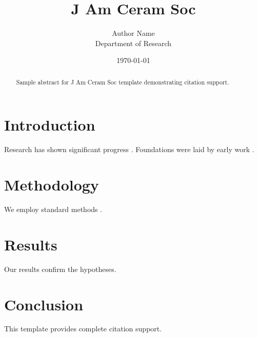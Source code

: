 \documentclass{llncs}
\title{J Am Ceram Soc}
\author{Author Name \\ \small Department of Research}
\date{\today}
\begin{document}
\maketitle

\begin{abstract}
Sample abstract for J Am Ceram Soc template demonstrating citation support.
\end{abstract}

\section{Introduction}
Research has shown significant progress \citep{einstein1905}. Foundations were laid by early work \citep{turing1950}.

\section{Methodology}
We employ standard methods \citep{knuth1984}.

\section{Results}
Our results confirm the hypotheses.

\section{Conclusion}
This template provides complete citation support.



\end{document}
